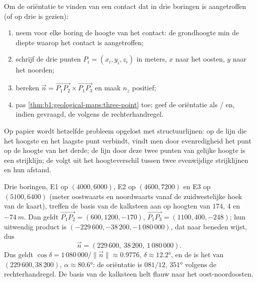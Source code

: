 \begin{method}\label{met:b1:geological-maps:three-point}
Om de oriëntatie te vinden van een contact dat in drie boringen is aangetroffen (of op drie
 is gezien):
\begin{enumerate}
  \item neem voor elke boring de hoogte van het contact: de grondhoogte min de diepte waarop het
        contact is aangetroffen;
  \item schrijf de drie punten $P_i = (x_i, y_i, z_i)$ in meters, $x$ naar het oosten,
        $y$ naar het noorden;
  \item bereken $\vec n = \overrightarrow{P_1P_2} \times
        \overrightarrow{P_1P_3}$ en maak $n_z$ positief;
  \item pas \cref{thm:b1:geological-maps:three-point} toe; geef de oriëntatie als
        / en, indien gevraagd, de  volgens de rechterhandregel.
\end{enumerate}
Op papier wordt hetzelfde probleem opgelost met structuurlijnen: op de lijn die het hoogste en
het laagste punt verbindt, vindt men door evenredigheid het punt op de hoogte van het derde; de lijn
door deze twee punten van gelijke hoogte is een strijklijn; de  volgt uit het hoogteverschil
tussen twee evenwijdige strijklijnen en hun afstand.
\end{method}

\begin{example}\label{ex:b1:geological-maps:east}
Drie boringen, E1 op $(4000, 6000)$, E2 op $(4600, 7200)$ en E3 op
$(5100, 6400)$ (meter oostwaarts en noordwaarts vanaf de zuidwestelijke hoek van de kaart),
treffen de basis van de kalksteen aan op hoogten van $174$, $4$ en $\qty{-74}{m}$. Dan geldt
$\overrightarrow{P_1P_2} = (600, 1200, -170)$,
$\overrightarrow{P_1P_3} = (1100, 400, -248)$; hun uitwendig product is
$(-229\,600, -38\,200, -1\,080\,000)$, dat naar beneden wijst, dus
\[
  \vec n = (229\,600,\ 38\,200,\ 1\,080\,000).
\]
Dus geldt $\cos\delta = 1\,080\,000/\|\vec n\| \approx
0.9776$, $\delta \approx \ang{12.2}$, en de  is het  van
$(229\,600, 38\,200)$, $\alpha \approx \ang{80.6}$: de oriëntatie is
$081/12$,  $\ang{351}$ volgens de rechterhandregel. De basis van de
kalksteen helt flauw naar het oost-noordoosten.
\end{example}

